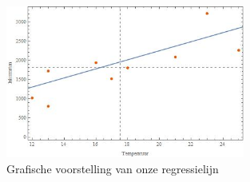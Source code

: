 \documentclass[11pt]{report}
\begin{document}
\begin{figure}[H]
  \centering
  \includegraphics[width=0.7\textwidth]{RegressieCafeScatterplotRegressionLine.jpg}
  \caption{Grafische voorstelling van onze regressielijn}
  \label{regressionAveragesPlot}
\end{figure}

\newpage
\end{document}
